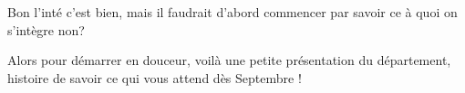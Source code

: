 Bon l'inté c'est bien, mais il faudrait d'abord commencer par savoir ce à quoi on s'intègre non? 

Alors pour démarrer en douceur, voilà une petite présentation du département, histoire de savoir ce qui vous attend dès Septembre ! 
